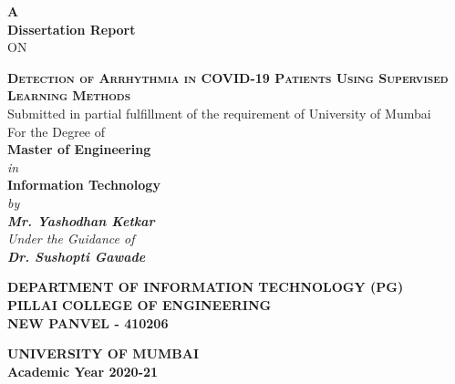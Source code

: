 \begin{titlepage}
  \thispagestyle{empty}

  {\centering
    {\Large\bf
      A\\
      \vspace{0.5cm}
      Dissertation Report}\\
    \vspace{0.5cm}
    {ON}
    \\
  }

  \vspace{0.4cm}
  {\centering
  \large
  {\LARGE\bf \scshape{Detection of Arrhythmia in COVID-19 Patients Using Supervised Learning Methods}}\\
  \vspace{1cm}
  {Submitted in partial fulfillment of the requirement of University of Mumbai} \\
  {For the Degree of } \\
  \vspace{0.2cm}
  {\bf Master of Engineering } \\
  {\it{in}} \\
  {\bf Information Technology } \\
  \vspace{0.6cm}
  \it{by} \\
  \vspace{.2cm}
  \rm
  {\large \bf {Mr. Yashodhan Ketkar}}\\

  \vspace{0.8cm}
  {\it{Under the Guidance of}} \\
  \vspace{.2cm}
  \hspace{.05cm} {\large \textbf {Dr. Sushopti Gawade}}\\
  \vspace {1cm}

  \begin{figure}[h!]
    {\par}
  \end{figure}
  \vspace{0.2cm}

  {\bf
    DEPARTMENT OF INFORMATION TECHNOLOGY (PG) \\
    \vspace{0.2cm}
    \bf {PILLAI COLLEGE OF ENGINEERING}\\
    \bf NEW PANVEL - 410206
  } \\
  {\centering
  \hspace{.5cm}


  {\centering
    {\bf UNIVERSITY OF MUMBAI} \\
    \vspace{0.2cm}
  }
  {\centering
    {\bf Academic Year 2020-21}}
  }
  \\
  }
\end{titlepage}
